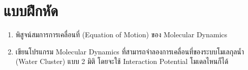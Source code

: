 \section{แบบฝึกหัด}

\begin{enumerate}[topsep=0pt,noitemsep]
  \setlength\itemsep{1em}
  \item พิสูจน์สมการการเคลื่อนที่ (Equation of Motion) ของ Molecular Dynamics

  \item เขียนโปรแกรม Molecular Dynamics ที่สามารถจำลองการเคลื่อนที่ของระบบโมเลกุลน้ำ (Water Cluster) แบบ 2 มิติ
        โดยจะใช้ Interaction Potential โมเดลไหนก็ได้
\end{enumerate}
